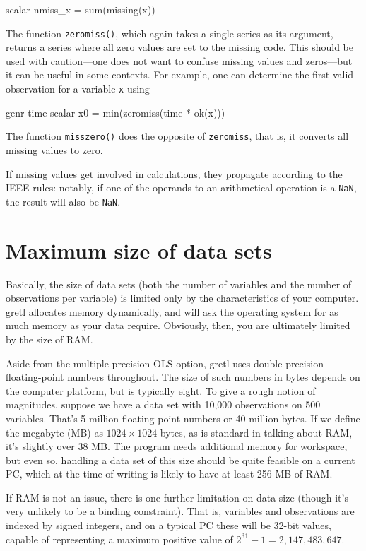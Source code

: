 \begin{code}
scalar nmiss_x = sum(missing(x))
\end{code}

The function \verb+zeromiss()+, which again takes a single series as
its argument, returns a series where all zero values are set to the
missing code.  This should be used with caution---one does not want to
confuse missing values and zeros---but it can be useful in some
contexts.  For example, one can determine the first valid observation
for a variable \verb+x+ using

\begin{code}
genr time
scalar x0 = min(zeromiss(time * ok(x)))
\end{code}

The function \verb+misszero()+ does the opposite of \verb+zeromiss+,
that is, it converts all missing values to zero.

If missing values get involved in calculations, they propagate
according to the IEEE rules: notably, if one of the operands to an
arithmetical operation is a \texttt{NaN}, the result will also be
\texttt{NaN}.
    
\section{Maximum size of data sets}
\label{data-limits}

Basically, the size of data sets (both the number of variables and the
number of observations per variable) is limited only by the
characteristics of your computer.  gretl allocates memory
dynamically, and will ask the operating system for as much memory as
your data require.  Obviously, then, you are ultimately limited by the
size of RAM.

Aside from the multiple-precision OLS option, gretl uses
double-precision floating-point numbers throughout.  The size of such
numbers in bytes depends on the computer platform, but is typically
eight.  To give a rough notion of magnitudes, suppose we have a data
set with 10,000 observations on 500 variables.  That's 5 million
floating-point numbers or 40 million bytes.  If we define the megabyte
(MB) as $1024 \times 1024$ bytes, as is standard in talking about RAM,
it's slightly over 38 MB.  The program needs additional memory for
workspace, but even so, handling a data set of this size should be
quite feasible on a current PC, which at the time of writing is likely
to have at least 256 MB of RAM.  

If RAM is not an issue, there is one further limitation on data size
(though it's very unlikely to be a binding constraint).  That is,
variables and observations are indexed by signed integers, and on a
typical PC these will be 32-bit values, capable of representing
a maximum positive value of $2^{31} - 1 = 2,147,483,647$.

